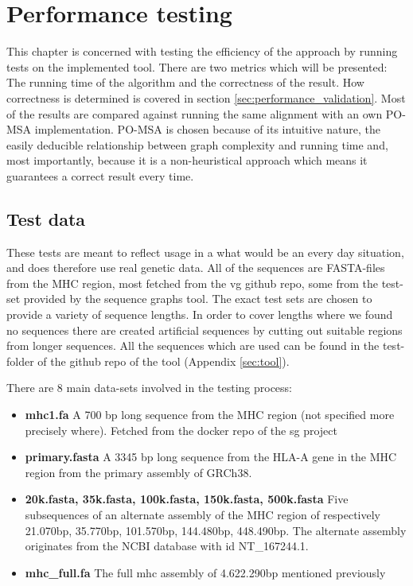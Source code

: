 \documentclass[thesis.tex]{subfiles}
\begin{document}
\chapter{Performance testing}
This chapter is concerned with testing the efficiency of the approach by running tests on the implemented tool. There are two metrics which will be presented: The running time of the algorithm and the correctness of the result. How correctness is determined is covered in section \ref{sec:performance_validation}. Most of the results are compared against running the same alignment with an own PO-MSA implementation. PO-MSA is chosen because of its intuitive nature, the easily deducible relationship between graph complexity and running time and, most importantly, because it is a non-heuristical approach which means it guarantees a correct result every time.
\section{Test data}
These tests are meant to reflect usage in a what would be an every day situation, and does therefore use real genetic data. All of the sequences are FASTA-files from the MHC region, most fetched from the vg github repo\cite{vg}, some from the test-set provided by the sequence graphs tool\cite{sequence_graphs}. The exact test sets are chosen to provide a variety of sequence lengths. In order to cover lengths where we found no sequences there are created artificial sequences by cutting out suitable regions from longer sequences. All the sequences which are used can be found in the test-folder of the github repo of the tool (Appendix \ref{sec:tool}).\\
\par\noindent
There are 8 main data-sets involved in the testing process:
\begin{itemize}
  \item \textbf{mhc1.fa} A 700 bp long sequence from the MHC region (not specified more precisely where). Fetched from the docker repo of the sg project
  \item \textbf{primary.fasta} A 3345 bp long sequence from the HLA-A gene in the MHC region from the primary assembly of GRCh38.
  \item \textbf{20k.fasta, 35k.fasta, 100k.fasta, 150k.fasta, 500k.fasta} Five subsequences of an alternate assembly of the MHC region of respectively 21.070bp, 35.770bp, 101.570bp, 144.480bp, 448.490bp. The alternate assembly originates from the NCBI database\cite{ncbi} with id NT\_167244.1.
  \item \textbf{mhc\_full.fa} The full mhc assembly of 4.622.290bp mentioned previously
\end{itemize}
\end{document}

